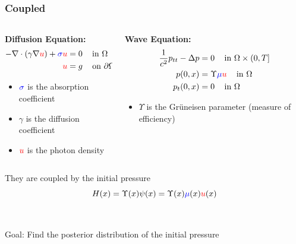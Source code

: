 \documentclass[9pt]{beamer}
\newcommand{\bd}{\partial\Omega}
\begin{document}
\subsection{}
\begin{frame}
\frametitle{Coupled}
\begin{columns}
	 \begin{column}{.5\textwidth}
    	 \textbf{Diffusion Equation:}
                \begin{align*}
                  -\nabla \cdot (\gamma \nabla {\color{red} u}) +{\color{blue} \sigma} {\color{red} u}  &= 0 \;\;\;\text{ in } \Omega\\
            	{\color{red} u}  &= g\;\;\; \text{ on } \bd
                \end{align*}
                \begin{itemize}
            	\item ${\color{blue} \sigma}$ is the absorption coefficient
            	\item $\gamma$ is the diffusion coefficient 
            	\item $\color{red} u$ is the photon density 
                 \end{itemize}
 	\end{column}
  	\begin{column}{.5\textwidth}
            \textbf{Wave Equation:}
            \begin{align*}
            \frac{1}{c^2} p_{tt} - \Delta p &= 0\;\;\;\text{ in } \Omega \times (0,T] \\
            p(0,x) & =  \Upsilon {\color{blue} \mu} {\color{red} u} \;\;\;\text{ in } \Omega \\
            p_t(0,x) &= 0 \;\;\;\text{ in }  \Omega
            \end{align*}
            \begin{itemize}
            \item $\Upsilon$ is the Gr\"{u}neisen parameter (measure of efficiency)
            \end{itemize}
	\end{column}
\end{columns}
\vspace{5mm}
They are coupled by the initial pressure
\[
H(x)  = \Upsilon(x) \psi(x) = \Upsilon(x) {\color{blue}\mu} (x) {\color{red} u} (x)
\]
\\~\\
\pause
Goal: Find the posterior distribution of the initial pressure
\end{frame}
\end{document}
